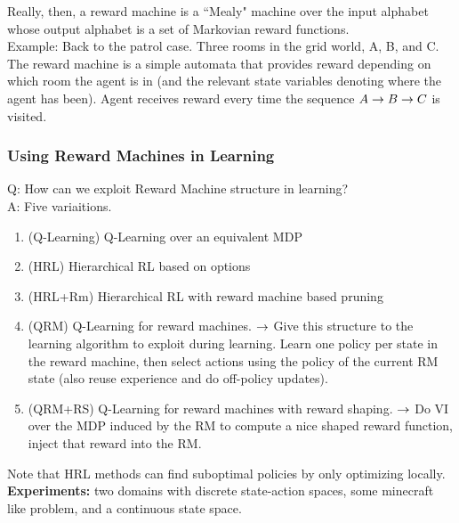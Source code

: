 
Really, then, a reward machine is a ``Mealy" machine over the input alphabet whose output alphabet is a set of Markovian reward functions.\\

Example: Back to the patrol case. Three rooms in the grid world, A, B, and C. The reward machine is a simple automata that provides reward depending on which room the agent is in (and the relevant state variables denoting where the agent has been). Agent receives reward every time the sequence $A \rightarrow B \rightarrow C$ is visited.

\subsubsection{Using Reward Machines in Learning}

Q: How can we exploit Reward Machine structure in learning? \\

A: Five variaitions.
\begin{enumerate}
\item (Q-Learning) Q-Learning over an equivalent MDP
\item (HRL) Hierarchical RL based on options
\item (HRL+Rm) Hierarchical RL with reward machine based pruning
\item (QRM) Q-Learning for reward machines.
$\rightarrow$ Give this structure to the learning algorithm to exploit during learning. Learn one policy per state in the reward machine, then select actions using the policy of the current RM state (also reuse experience and do off-policy updates).
\item (QRM+RS) Q-Learning for reward machines with reward shaping.
$\rightarrow$ Do VI over the MDP induced by the RM to compute a nice shaped reward function, inject that reward into the RM.
\end{enumerate}

Note that HRL methods can find suboptimal policies by only optimizing locally. \\

{\bf Experiments:} two domains with discrete state-action spaces, some minecraft like problem, and a continuous state space. \\

